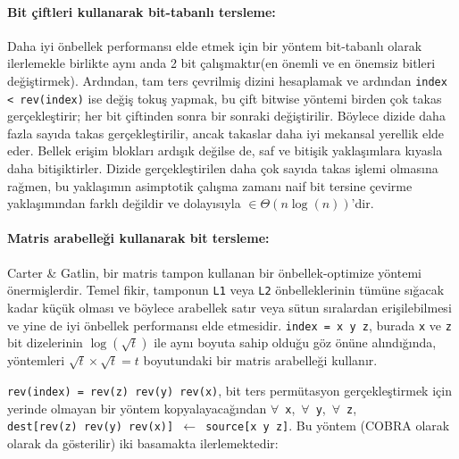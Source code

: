 \documentclass[10pt]{article}
\begin{document}
\paragraph{Bit \c{c}iftleri kullanarak bit-tabanl{\i} tersleme:}

Daha iyi \"{o}nbellek performans{\i} elde etmek i\c{c}in bir y\"{o}ntem bit-tabanl{\i} olarak ilerlemekle
birlikte ayn{\i} anda 2 bit \c{c}al{\i}\c{s}makt{\i}r(en \"{o}nemli ve en \"{o}nemsiz bitleri de\u{g}i\c{s}tirmek). 
Ard{\i}ndan, tam ters \c{c}evrilmi\c{s} dizini hesaplamak ve ard{\i}ndan {\tt index < rev(index)} 
ise de\u{g}i\c{s} toku\c{s} yapmak, bu \c{c}ift bitwise y\"{o}ntemi birden \c{c}ok takas ger\c{c}ekle\c{s}tirir; 
her bit \c{c}iftinden sonra bir sonraki de\u{g}i\c{s}tirilir\cite{perez:place}. 
B\"{o}ylece dizide daha fazla say{\i}da takas ger\c{c}ekle\c{s}tirilir, ancak takaslar daha iyi mekansal
yerellik elde eder. Bellek eri\c{s}im bloklar{\i} ard{\i}\c{s}{\i}k de\u{g}ilse de, saf ve biti\c{s}ik yakla\c{s}{\i}mlara
k{\i}yasla daha biti\c{s}iktirler. Dizide ger\c{c}ekle\c{s}tirilen daha \c{c}ok say{\i}da takas i\c{s}lemi olmas{\i}na 
ra\u{g}men, bu yakla\c{s}{\i}m{\i}n asimptotik \c{c}al{\i}\c{s}ma zaman{\i} naif bit tersine \c{c}evirme yakla\c{s}{\i}m{\i}ndan 
farkl{\i} de\u{g}ildir ve dolay{\i}s{\i}yla $\in \Theta(n \log(n))$'dir.


\paragraph{Matris arabelle\u{g}i kullanarak bit tersleme:}
Carter \& Gatlin, bir matris tampon kullanan bir \"{o}nbellek-optimize y\"{o}ntemi \"{o}nermi\c{s}lerdir. 
Temel fikir, tamponun {\tt L1} veya {\tt L2} \"{o}nbelleklerinin t\"{u}m\"{u}ne s{\i}\u{g}acak kadar k\"{u}\c{c}\"{u}k olmas{\i} ve
b\"{o}ylece arabellek sat{\i}r veya s\"{u}tun s{\i}ralardan eri\c{s}ilebilmesi ve yine de iyi \"{o}nbellek 
performans{\i} elde etmesidir. {\tt index = x y z}, burada {\tt x} ve {\tt z} bit 
dizelerinin $\log(\sqrt{t})$ ile ayn{\i} boyuta sahip oldu\u{g}u g\"{o}z \"{o}n\"{u}ne al{\i}nd{\i}\u{g}{\i}nda,
y\"{o}ntemleri $\sqrt{t} \times \sqrt{t} = t$ boyutundaki 
bir matris arabelle\u{g}i kullan{\i}r\cite{carter:towards}.

{\tt rev(index) = rev(z) rev(y) rev(x)}, bit ters perm\"{u}tasyon ger\c{c}ekle\c{s}tirmek
 i\c{c}in yerinde olmayan bir y\"{o}ntem kopyalayaca\u{g}{\i}ndan
$\forall$~{\tt x},~$\forall$~{\tt y},~$\forall$~{\tt z},~{\tt
  dest[rev(z)~rev(y)~rev(x)]~$\gets$~source[x~y~z]}. Bu y\"{o}ntem 
  (COBRA olarak \cite{carter:towards} olarak da g\"{o}sterilir) iki basamakta ilerlemektedir: 
\end{document}
